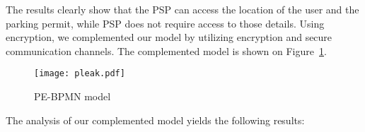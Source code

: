 The results clearly show that the PSP can access the location of the user and
the parking permit, while PSP does not require access to those details. Using
encryption, we complemented our model by utilizing encryption and secure
communication channels. The complemented model is shown on
Figure~\ref{fig:pleak-model}.

\begin{landscape}

\begin{figure}[ht]
\begin{center}
    \texttt{[image: pleak.pdf]}
    \caption{PE-BPMN model}
    \label{fig:pleak-model}
\end{center}
\end{figure}

\end{landscape}

The analysis of our complemented model yields the following results:


